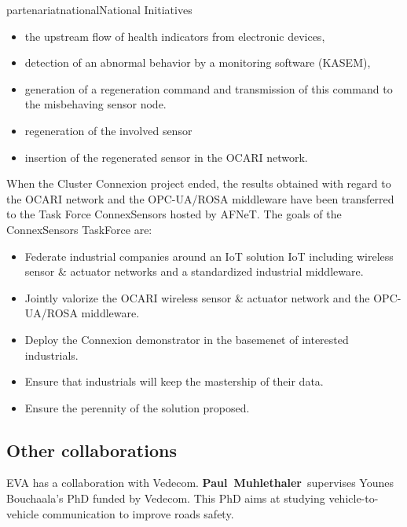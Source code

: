 \documentclass{ra2016}
\newcommand{\paul}             {\textbf{Paul~Muhlethaler}}
\begin{document}
\begin{module}{partenariat}{national}{National Initiatives}
\begin{itemize}
    \item the upstream flow of health indicators from electronic devices,
    \item detection of an abnormal behavior by a monitoring software (KASEM),  
    \item generation of a regeneration command and transmission of this command to the misbehaving sensor node.
    \item regeneration of the involved sensor
    \item insertion of the regenerated sensor in the OCARI network.\\
\end{itemize}

When the Cluster Connexion project ended, the results obtained with regard to the OCARI network and the OPC-UA/ROSA middleware have been transferred to the Task Force ConnexSensors hosted by AFNeT. The goals of the ConnexSensors TaskForce are:

\begin{itemize}
    \item Federate industrial companies around an IoT solution IoT including wireless sensor \& actuator networks and a standardized industrial middleware.
    \item Jointly valorize the OCARI wireless sensor \& actuator network and the OPC-UA/ROSA middleware.
    \item Deploy the Connexion demonstrator in the basemenet of interested industrials. 
    \item Ensure that industrials will keep the mastership of their data. 
    \item Ensure the perennity of the solution proposed.\\
\end{itemize}

\subsection{Other collaborations}

EVA has a collaboration with Vedecom. 
\paul~supervises Younes Bouchaala's PhD funded by Vedecom.
This PhD aims at studying vehicle-to-vehicle communication to improve roads safety.

\end{module} 

\end{document}
